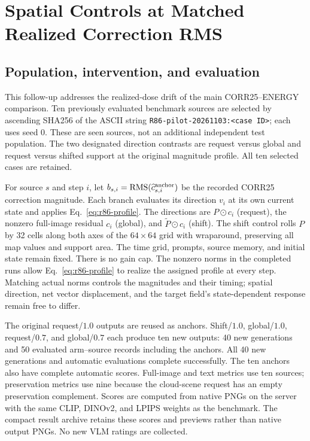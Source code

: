 
\section{Spatial Controls at Matched Realized Correction RMS}
\label{sec:r86-details}
\subsection{Population, intervention, and evaluation}
This follow-up addresses the realized-dose drift of the main CORR25--ENERGY comparison. Ten previously evaluated benchmark sources are selected by ascending SHA256 of the ASCII string \texttt{R86-pilot-20261103:<case ID>}; each uses seed 0. These are seen sources, not an additional independent test population. The two designated direction contrasts are request versus global and request versus shifted support at the original magnitude profile. All ten selected cases are retained.

For source $s$ and step $i$, let $b_{s,i}=\operatorname{RMS}(\widehat c^{\rm anchor}_{s,i})$ be the recorded CORR25 correction magnitude. Each branch evaluates its direction $v_i$ at its own current state and applies Eq.~\eqref{eq:r86-profile}.
The directions are $P\odot c_i$ (request), the nonzero full-image residual $c_i$ (global), and $\widetilde P\odot c_i$ (shift). The shift control rolls $P$ by 32 cells along both axes of the $64\times64$ grid with wraparound, preserving all map values and support area. The time grid, prompts, source memory, and initial state remain fixed. There is no gain cap. The nonzero norms in the completed runs allow Eq.~\eqref{eq:r86-profile} to realize the assigned profile at every step. Matching actual norms controls the magnitudes and their timing; spatial direction, net vector displacement, and the target field's state-dependent response remain free to differ.

The original request/$1.0$ outputs are reused as anchors. Shift/$1.0$, global/$1.0$, request/$0.7$, and global/$0.7$ each produce ten new outputs: 40 new generations and 50 evaluated arm--source records including the anchors. All 40 new generations and automatic evaluations complete successfully. The ten anchors also have complete automatic scores. Full-image and text metrics use ten sources; preservation metrics use nine because the cloud-scene request has an empty preservation complement. Scores are computed from native PNGs on the server with the same CLIP, DINOv2, and LPIPS weights as the benchmark. The compact result archive retains these scores and previews rather than native output PNGs. No new VLM ratings are collected.

